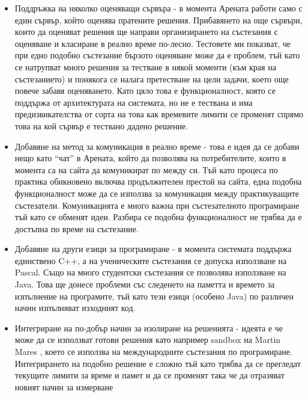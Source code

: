 \documentclass[a4paper,12pt]{article}
\begin{document}
    \begin{itemize}
      \item Поддръжка на няколко оценяващи сървъра - в момента Арената работи само с един сървър, който оценява пратените решения. Прибавянето на още сървъри, които да оценяват решения ще направи организирането на състезания с оценяване и класиране в реално време по-лесно. Тестовете ми показват, че при едно подобно състезание бързото оценяване може да е проблем, тъй като се натрупват много решения за тестване в някой моменти (към края на състезанието) и понякога се налага претестване на цели задачи, което още повече забавя оценяването. Като цяло това е функционалност, която се поддържа от архитектурата на системата, но не е тествана и има предизвикателства от сорта на това как времевите лимити се променят спрямо това на кой сървър е тествано дадено решение.
      \item Добавяне на метод за комуникация в реално време - това е идея да се добави нещо като ``чат'' в Арената, който да позволява на потребителите, които в момента са на сайта да комуникират по между си. Тъй като процеса по практика обикновено включва продължителен престой на сайта, една подобна функционалност може да се използва за комуникация между практикуващите състезатели. Комуникацията е много важна при състезателното програмиране тъй като се обменят идеи. Разбира се подобна функционалност не трябва да е достъпна по време на състезание.
      \item Добавяне на други езици за програмиране - в момента системата поддържа единствено C++, а на ученическите състезания се допуска използване на Pascal. Също на много студентски състезания се позволява използване на Java. Това ще донесе проблеми със следенето на паметта и времето за изпълнение на програмите, тъй като тези езици (особено Java) по различен начин изпълняват изходният код.
      \item Интегриране на по-добър начин за изолиране на решенията - идеята е че може да се използват готови решения като например sandbox на Martin Mares \cite{moe_sandbox}, което се използва на международните състезания по програмиране. Интегрирането на подобно решение е сложно тъй като трябва да се прегледат текущите лимити за време и памет и да се променят така че да отразяват новият начин за измерване
    \end{itemize}
  
  \newpage
  
\end{document}
